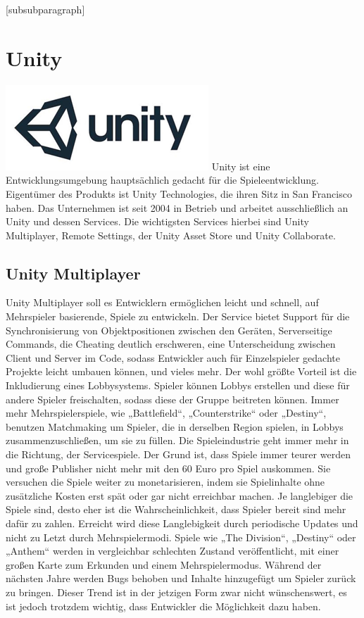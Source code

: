 \setcounter{tocdepth}{4}
\setcounter{secnumdepth}{4}
[subsubparagraph]
\section{Unity}
\includegraphics{images/unityLogo.png}
\newline
Unity ist eine Entwicklungsumgebung hauptsächlich gedacht für die Spieleentwicklung. Eigentümer des Produkts ist Unity Technologies, die ihren Sitz in San Francisco haben. 
Das Unternehmen ist seit 2004 in Betrieb und arbeitet ausschließlich an Unity und dessen Services. Die wichtigsten Services hierbei sind Unity Multiplayer, Remote Settings, der Unity Asset Store und Unity Collaborate. 

\subsection{Unity Multiplayer}
Unity Multiplayer soll es Entwicklern ermöglichen leicht und schnell, auf Mehrspieler basierende, Spiele zu entwickeln. Der Service bietet Support für die Synchronisierung von Objektpositionen zwischen den Geräten, Serverseitige Commands, die Cheating deutlich erschweren, eine Unterscheidung zwischen Client und Server im Code, sodass Entwickler auch für Einzelspieler gedachte Projekte leicht umbauen können, und vieles mehr. Der wohl größte Vorteil ist die Inkludierung eines Lobbysystems. Spieler können Lobbys erstellen und diese für andere Spieler freischalten, sodass diese der Gruppe beitreten können. Immer mehr Mehrspielerspiele, wie „Battlefield“, „Counterstrike“ oder „Destiny“, benutzen Matchmaking um Spieler, die in derselben Region spielen, in Lobbys zusammenzuschließen, um sie zu füllen. Die Spieleindustrie geht immer mehr in die Richtung, der Servicespiele. Der Grund ist, dass Spiele immer teurer werden und große Publisher nicht mehr mit den 60 Euro pro Spiel auskommen. Sie versuchen die Spiele weiter zu monetarisieren, indem sie Spielinhalte ohne zusätzliche Kosten erst spät oder gar nicht erreichbar machen. Je langlebiger die Spiele sind, desto eher ist die Wahrscheinlichkeit, dass Spieler bereit sind mehr dafür zu zahlen. Erreicht wird diese Langlebigkeit durch periodische Updates und nicht zu Letzt durch Mehrspielermodi. Spiele wie „The Division“, „Destiny“ oder „Anthem“ werden in vergleichbar schlechten Zustand veröffentlicht, mit einer großen Karte zum Erkunden und einem Mehrspielermodus. Während der nächsten Jahre werden Bugs behoben und Inhalte hinzugefügt um Spieler zurück zu bringen. Dieser Trend ist in der jetzigen Form zwar nicht wünschenswert, es ist jedoch trotzdem wichtig, dass Entwickler die Möglichkeit dazu haben. 

